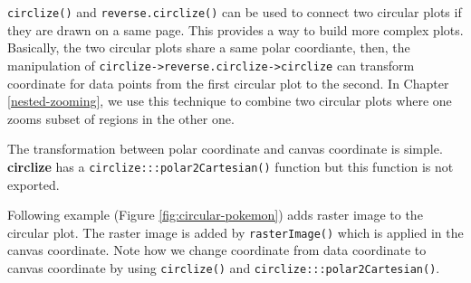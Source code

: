 \documentclass[]{book}
\theoremstyle{definition}
\theoremstyle{definition}
\theoremstyle{remark}
\begin{document}
\texttt{circlize()} and \texttt{reverse.circlize()} can be used to
connect two circular plots if they are drawn on a same page. This
provides a way to build more complex plots. Basically, the two circular
plots share a same polar coordiante, then, the manipulation of
\texttt{circlize-\textgreater{}reverse.circlize-\textgreater{}circlize}
can transform coordinate for data points from the first circular plot to
the second. In Chapter \ref{nested-zooming}, we use this technique to
combine two circular plots where one zooms subset of regions in the
other one.

The transformation between polar coordinate and canvas coordinate is
simple. \textbf{circlize} has a \texttt{circlize:::polar2Cartesian()}
function but this function is not exported.

Following example (Figure \ref{fig:circular-pokemon}) adds raster image
to the circular plot. The raster image is added by
\texttt{rasterImage()} which is applied in the canvas coordinate. Note
how we change coordinate from data coordinate to canvas coordinate by
using \texttt{circlize()} and \texttt{circlize:::polar2Cartesian()}.
\end{document}
